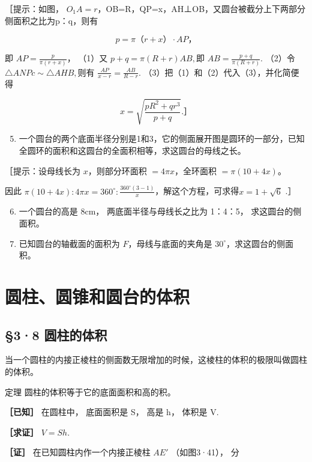 ［提示：如图，
\(O_{1}A=r\)，OB=R，QP=x，AH⊥OB，又圆台被截分上下两部分侧面积之比为p：q，则有

\[
p = \pi \text{（}r + x\text{）} \cdot A P\text{，}
\]

即 \(AP=\frac{p}{\pi(r+x)}\)， （1）又 \(p + q = \pi (R + r)AB,\)即
\(AB = \frac{p + q}{\pi(R + r)}.\) （2）令
\(\triangle ANPc\sim \triangle AHB,\)则有
\(\frac{AP}{x - r} = \frac{AB}{R - r}\).
（3）把（1）和（2）代入（3），并化简便得

\[
x = \sqrt {\frac {p R ^ {2} + q r ^ {3}}{p + q}}. \text{］}
\]

\begin{enumerate}
\setcounter{enumi}{4}
\item
  一个圆台的两个底面半径分别是1和3，它的侧面展开图是圆环的一部分，已知全圆环的面积和这圆台的全面积相等，求这圆台的母线之长。
\end{enumerate}

［提示：设母线长为 \(x\)，则部分环面积 \(= 4\pi x\)，全环面积
\(= \pi (10 + 4x)\)。

因此
\(\pi (10 + 4x):4\pi x = 360^{\circ}:\frac{360^{\circ}(3 - 1)}{x}\)，解这个方程，可求得\(x = 1 + \sqrt{6}\)
.］

\begin{enumerate}
\setcounter{enumi}{5}
\item
  一个圆台的高是 \(8\mathrm{cm}\)， 两底面半径与母线长之比为 1：4：5，
  求这圆台的侧面积。
\item
  已知圆台的轴截面的面积为 \(F\)，母线与底面的夹角是
  \(30^{\circ}\)，求这圆台的侧面积。
\end{enumerate}

\section{圆柱、圆锥和圆台的体积}

\subsection{§3·8 圆柱的体积}

当一个圆柱的内接正棱柱的侧面数无限增加的时候，这棱柱的体积的极限叫做圆柱的体积。

定理 圆柱的体积等于它的底面面积和高的积。

\textbf{［已知］} 在圆柱中， 底面面积是 S， 高是 h， 体积是 V.

\textbf{［求证］} \(V = Sh.\)

\textbf{［证］} 在已知圆柱内作一个内接正棱柱 \(AE'\) （如图3·41）， 分

